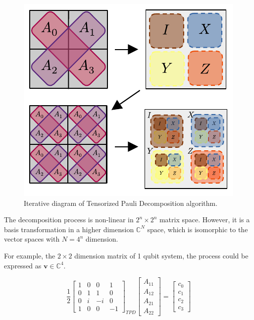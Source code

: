 \documentclass[twocolumn]{article}
\begin{document}
\begin{figure}[!h]
    \centering
    \includegraphics*{images/tpd_diagram.pdf}
    \caption{Iterative diagram of Tensorized Pauli Decomposition algorithm.}
    \label{fig:tpd_diagram}
\end{figure}

The decomposition process is non-linear in $2^n \times 2^n$ matrix space. 
However, it is a basis transformation in a higher dimension $\mathbb{C}^N$ space, 
which is isomorphic to the vector spaces with $N = 4^n$ dimension.

For example, the $2 \times 2$ dimension matrix of 1 qubit system, the process could be expressed as 
$\mathbf{v} \in \mathbb{C}^4$. 

\begin{equation}
    \frac{1}{2}
    \begin{bmatrix}
        1 & 0 &  0 &  1\\
        0 & 1 &  1 &  0\\ 
        0 & i & -i &  0\\ 
        1 & 0 &  0 & -1 
    \end{bmatrix}_{TPD}
    \begin{bmatrix}
        A_{11} \\
        A_{12} \\
        A_{21} \\
        A_{22}
    \end{bmatrix} =
    \begin{bmatrix}
        c_0\\
        c_1\\
        c_2\\
        c_3
    \end{bmatrix}
\end{equation}
\end{document}
